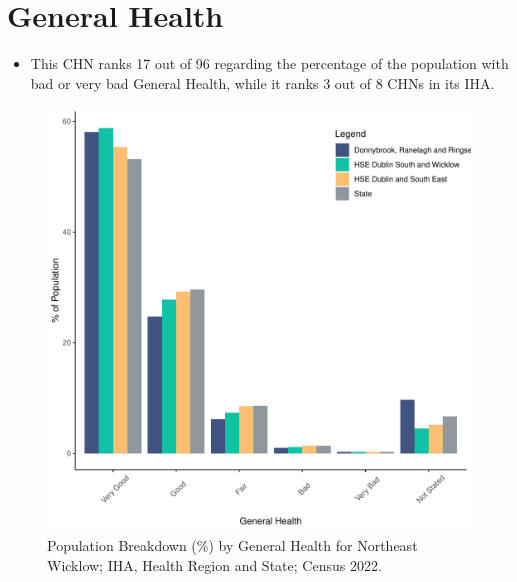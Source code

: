 \documentclass{article}
\begin{document}
\pagebreak

\section{General Health}\label{sect:GenHealth}
\begin{itemize}
\item  This CHN ranks  17 out of 96 regarding the percentage of the population with bad or very bad General Health, while it ranks   3 out of 8 CHNs in its IHA.
\end{itemize}
\begin{figure}[h]
	\centering
	\includegraphics[width = 150mm]{../figures/GenED.pdf}
	\caption{Population Breakdown (\%) by General Health for Northeast Wicklow; IHA, Health Region and State;  Census 2022.}
	\label{fig:2ae19629-1a6a-13a3-e055-000000000001}
	\end{figure}
\end{document}

